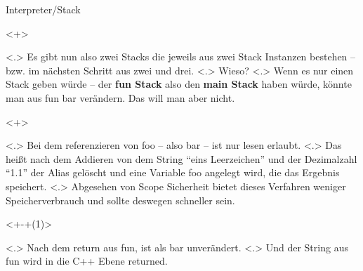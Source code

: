 \begin{frame}{Interpreter/Stack}
    \begin{uncoverenv}<+>%
    \end{uncoverenv}%
        \note[item]<.>{
          Es gibt nun also zwei Stacks die jeweils aus zwei Stack Instanzen bestehen -- bzw. im nächsten Schritt aus zwei und drei.
        }
        \note[item]<.>{
          Wieso?
        }
        \note[item]<.>{
          Wenn es nur einen Stack geben würde -- der \textbf{fun Stack} also den \textbf{main Stack} haben würde, könnte man aus fun bar verändern. Das will man aber nicht.
        }

    \begin{uncoverenv}<+>%
    \end{uncoverenv}%
        \note[item]<.>{
          Bei dem referenzieren von foo -- also bar -- ist nur lesen erlaubt.
        }
        \note[item]<.>{
          Das heißt nach dem Addieren von dem String ``eins Leerzeichen'' und der Dezimalzahl ``1.1'' der Alias gelöscht und eine Variable foo angelegt wird, die das Ergebnis speichert.
        }
        \note[item]<.>{
          Abgesehen von Scope Sicherheit bietet dieses Verfahren weniger Speicherverbrauch und sollte deswegen schneller sein.
        }

    \begin{uncoverenv}<+-+(1)>%
    \end{uncoverenv}%
        \note[item]<.>{
          Nach dem return aus fun, ist als bar unverändert.
        }
        \note[item]<.>{
          Und der String aus fun wird in die C++ Ebene returned.
        }


\end{frame}
